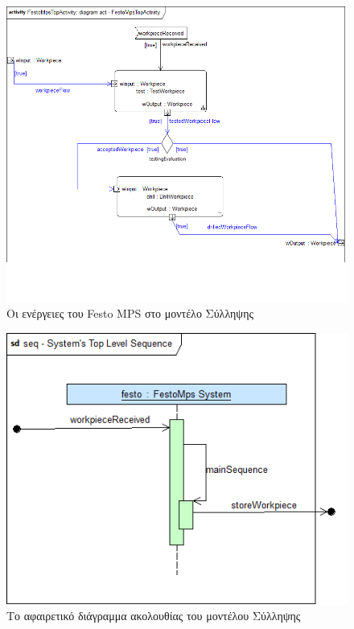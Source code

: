 \documentclass[a4paper,12pt,twoside]{report}
\begin{document}
\begin{appendices}
				\begin{figure}[hp]
					\centering
					\includegraphics[scale=0.45]{ConceptionalModel_act-SystemsTopLevelActivity.png}
					\caption{Οι ενέργειες του Festo MPS στο μοντέλο Σύλληψης}
					\label{φωτ:Οι ενέργειες του Festo MPS στο μοντέλο Σύλληψης}
				\end{figure}
				\begin{figure}[hp]
					\centering
					\includegraphics[scale=0.45]{ConceptionalModel_seq-SystemsTopLevelSequence.png}
					\caption{Το αφαιρετικό διάγραμμα ακολουθίας του μοντέλου Σύλληψης}
					\label{φωτ:Το αφαιρετικό διάγραμμα ακολουθίας του μοντέλου Σύλληψης}

\end{figure}
\end{appendices}
\end{document}
